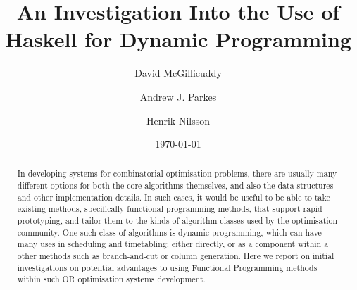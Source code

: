 \documentclass[smallextended]{svjour3}       %
\begin{document}
\title{An Investigation Into the Use of Haskell for Dynamic Programming
}


\author{
	David McGillicuddy \and
	Andrew J. Parkes \and
	Henrik Nilsson
}



\date{\today}


\maketitle

\begin{abstract}
In developing systems for combinatorial optimisation problems, 
there are usually many different options for both the core algorithms themselves, 
and also the data structures and other implementation details. 
In such cases, it would be useful to be able to take existing methods, specifically functional programming methods, that support 
rapid prototyping, and tailor them to the kinds of algorithm classes used by the optimisation community.
One such class of algorithms is dynamic programming, which can have many uses in scheduling and timetabling; either directly, or as a component within a other methods such as branch-and-cut or column generation.
Here we report on initial investigations on potential advantages to using Functional Programming methods within such OR optimisation systems development.

\end{abstract}
\end{document}
